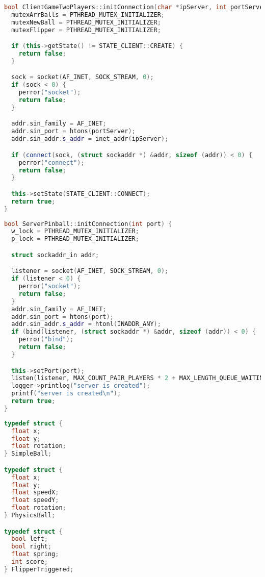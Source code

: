 \begin{lstlisting}[language=C++, caption={Создание соединения с сервером на клиенте},label=DescriptiveLabel]
bool ClientGameTwoPlayers::initConnection(char *ipServer, int portServer) {
  mutexArrBalls = PTHREAD_MUTEX_INITIALIZER;
  mutexNewBall = PTHREAD_MUTEX_INITIALIZER;
  mutexFlipper = PTHREAD_MUTEX_INITIALIZER;

  if (this->getState() != STATE_CLIENT::CREATE) {
    return false;
  }

  sock = socket(AF_INET, SOCK_STREAM, 0);
  if (sock < 0) {
    perror("socket");
    return false;
  }

  addr.sin_family = AF_INET;
  addr.sin_port = htons(portServer);
  addr.sin_addr.s_addr = inet_addr(ipServer);

  if (connect(sock, (struct sockaddr *) &addr, sizeof (addr)) < 0) {
    perror("connect");
    return false;
  }

  this->setState(STATE_CLIENT::CONNECT);
  return true;
}
\end{lstlisting}

\begin{lstlisting}[language=C++, caption={Подготовка сервера к слушанию клиентов},label=DescriptiveLabel]
bool ServerPinball::initConnection(int port) {
  w_lock = PTHREAD_MUTEX_INITIALIZER;
  p_lock = PTHREAD_MUTEX_INITIALIZER;

  struct sockaddr_in addr;

  listener = socket(AF_INET, SOCK_STREAM, 0);
  if (listener < 0) {
    perror("socket");
    return false;
  }
  addr.sin_family = AF_INET;
  addr.sin_port = htons(port);
  addr.sin_addr.s_addr = htonl(INADDR_ANY);
  if (bind(listener, (struct sockaddr *) &addr, sizeof (addr)) < 0) {
    perror("bind");
    return false;
  }

  this->setPort(port);
  listen(listener, MAX_COUNT_PAIR_PLAYERS * 2 + MAX_LENGTH_QUEUE_WAITING_PLAYERS);
  logger->printlog("server is created");
  printf("server is created\n");
  return true;
}
\end{lstlisting}

\begin{lstlisting}[language=C++, caption={Структуры данных передаваемых пакетов},label=DescriptiveLabel]
typedef struct {
  float x;
  float y;
  float rotation;
} SimpleBall;

typedef struct {
  float x;
  float y;
  float speedX;
  float speedY;
  float rotation;
} PhysicsBall;

typedef struct {
  bool left;
  bool right;
  float spring;
  int score;
} FlipperTriggered;

\end{lstlisting}

